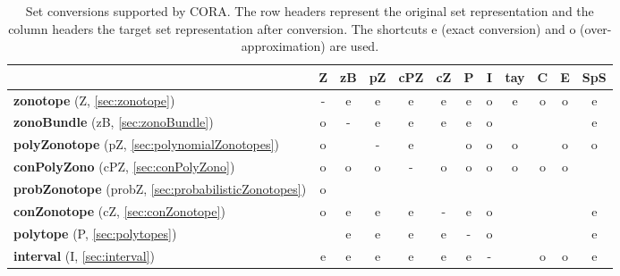 \begin{table}[htb]
    \centering
    \footnotesize
    \caption{Set conversions supported by CORA. The row headers represent the original set representation and the column headers the target set representation after conversion. The shortcuts e (exact conversion) and o (over-approximation) are used.}
    \label{tab:setConversion}
    \begin{tabular}{ l c c c c c c c c c c c}
        \toprule
        & \textbf{Z} & \textbf{zB} & \textbf{pZ} & \textbf{cPZ} & \textbf{cZ} & \textbf{P} & \textbf{I} & \textbf{tay} & \textbf{C} & \textbf{E} & \textbf{SpS}\\
        \midrule
        \textbf{zonotope} (Z, \cref{sec:zonotope})                       & -          & e           & e           & e            & e           & e          & o          & e            & o          & o          & e          \\
        \textbf{zonoBundle} (zB, \cref{sec:zonoBundle})                  & o          & -           & e           & e            & e           & e          & o          &              &            &            & e          \\
        \textbf{polyZonotope} (pZ, \cref{sec:polynomialZonotopes})       & o          &             & -           & e            &             & o          & o          & o            &            & o          & o          \\
        \textbf{conPolyZono} (cPZ, \cref{sec:conPolyZono})               & o          & o           & o           & -            & o           & o          & o          & o            & o          & o          &            \\
        \textbf{probZonotope} (probZ, \cref{sec:probabilisticZonotopes}) & o          &             &             &              &             &            &            &              &            &            &            \\
        \textbf{conZonotope} (cZ, \cref{sec:conZonotope})                & o          & e           & e           & e            & -           & e          & o          &              &            &            & e          \\
        \textbf{polytope} (P, \cref{sec:polytopes})                      &            & e           & e           & e            & e           & -          & o          &              &            &            & e          \\
        \textbf{interval} (I, \cref{sec:interval})                       & e          & e           & e           & e            & e           & e          & -          &              & o          & o          & e          \\

\end{tabular}
\end{table}
